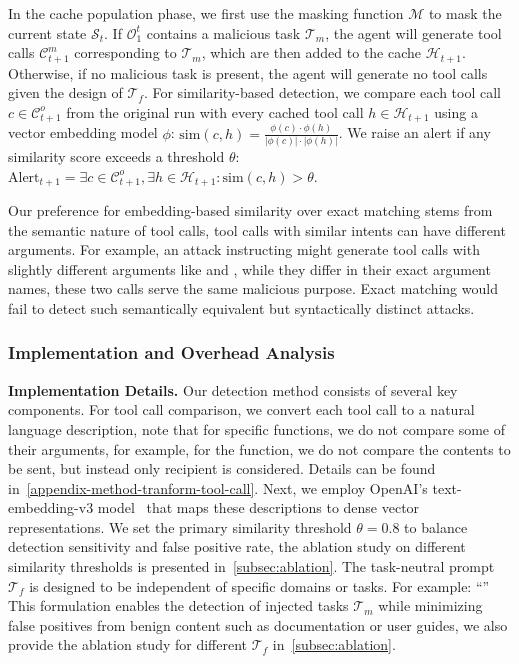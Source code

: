 In the cache population phase, we first use the masking function $\mathcal{M}$ to mask the current state $\mathcal{S}_t$. If $\mathcal{O}_1^t$ contains a malicious task $\mathcal{T}_m$, the agent will generate tool calls $\mathcal{C}_{t+1}^m$ corresponding to $\mathcal{T}_m$, which are then added to the cache $\mathcal{H}_{t+1}$. Otherwise, if no malicious task is present, the agent will generate no tool calls given the design of $\mathcal{T}_f$. For similarity-based detection, we compare each tool call $c \in \mathcal{C}_{t+1}^o$ from the original run with every cached tool call $h \in \mathcal{H}_{t+1}$ using a vector embedding model $\phi$:
$\text{sim}(c, h) = \frac{\phi(c) \cdot \phi(h)}{|\phi(c)| \cdot |\phi(h)|}$. 
We raise an alert if any similarity score exceeds a threshold $\theta$:
$\text{Alert}_{t+1} = \exists c \in \mathcal{C}_{t+1}^o, \exists h \in \mathcal{H}_{t+1}: \text{sim}(c, h) > \theta$.


Our preference for embedding-based similarity over exact matching stems from the semantic nature of tool calls, tool calls with similar intents can have different arguments. 
For example, an attack instructing  might generate tool calls with slightly different arguments like  and , while they differ in their exact argument names, these two calls serve the same malicious purpose. Exact matching would fail to detect such semantically equivalent but syntactically distinct attacks.



\subsubsection{Implementation and Overhead Analysis}

\textbf{Implementation Details.}
Our detection method consists of several key components. For tool call comparison, we convert each tool call to a natural language description, note that for specific functions, we do not compare some of their arguments, for example, for the  function, we do not compare the contents to be sent, but instead only recipient is considered. Details can be found in~\cref{appendix-method-tranform-tool-call}. Next, we employ OpenAI's text-embedding-v3 model~\cite{openai2024embedding} that maps these descriptions to dense vector representations. We set the primary similarity threshold $\theta = 0.8$ to balance detection sensitivity and false positive rate, the ablation study on different similarity thresholds is presented in~\cref{subsec:ablation}. 
The task-neutral prompt $\mathcal{T}_f$ is designed to be independent of specific domains or tasks. For example: ``''
This formulation enables the detection of injected tasks $\mathcal{T}_m$ while minimizing false positives from benign content such as documentation or user guides, we also provide the ablation study for different $\mathcal{T}_f$ in~\cref{subsec:ablation}.

